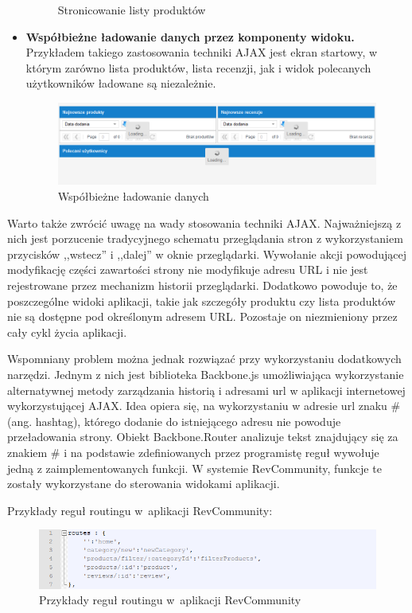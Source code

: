 \begin{itemize}
\begin{figure}[H]
	\caption{Stronicowanie listy produktów}
\end{figure}
\item\textbf{Współbieżne ładowanie danych przez komponenty widoku.} Przykładem takiego zastosowania techniki AJAX jest ekran startowy, w którym zarówno lista produktów, lista recenzji, jak i widok polecanych użytkowników ładowane są niezależnie.
\begin{figure}[H]
	\centering
	\includegraphics[width=\textwidth]{images/Loading.png}
	\caption{Współbieżne ładowanie danych}
\end{figure}
\end{itemize}


Warto także zwrócić uwagę na wady stosowania techniki AJAX. Najważniejszą z nich jest porzucenie tradycyjnego schematu przeglądania stron z wykorzystaniem przycisków ,,wstecz'' i ,,dalej'' w oknie przeglądarki. Wywołanie akcji powodującej modyfikację części zawartości strony nie modyfikuje adresu URL i nie jest rejestrowane przez mechanizm historii przeglądarki. Dodatkowo powoduje to, że poszczególne widoki aplikacji, takie jak szczegóły produktu czy lista produktów nie są dostępne pod określonym adresem URL. Pozostaje on niezmieniony przez cały cykl życia aplikacji.\cite{jsadv}

Wspomniany problem można jednak rozwiązać przy wykorzystaniu dodatkowych narzędzi. Jednym z nich jest biblioteka Backbone.js umożliwiająca wykorzystanie alternatywnej metody zarządzania historią i adresami url w aplikacji internetowej wykorzystującej AJAX. Idea opiera się, na wykorzystaniu w adresie url znaku \# (ang. hashtag), którego dodanie do istniejącego adresu nie powoduje przeładowania strony.\cite{urls} Obiekt Backbone.Router analizuje tekst znajdujący się za znakiem \# i na podstawie zdefiniowanych przez programistę reguł wywołuje jedną z zaimplementowanych funkcji. W systemie RevCommunity, funkcje te zostały wykorzystane do sterowania widokami aplikacji.\cite{backbone}

Przykłady reguł routingu w~aplikacji RevCommunity:

\begin{figure}[H]
	\centering
	\includegraphics[width=\textwidth]{images/routes.png}
	\caption{Przykłady reguł routingu w~aplikacji RevCommunity}
\end{figure}

